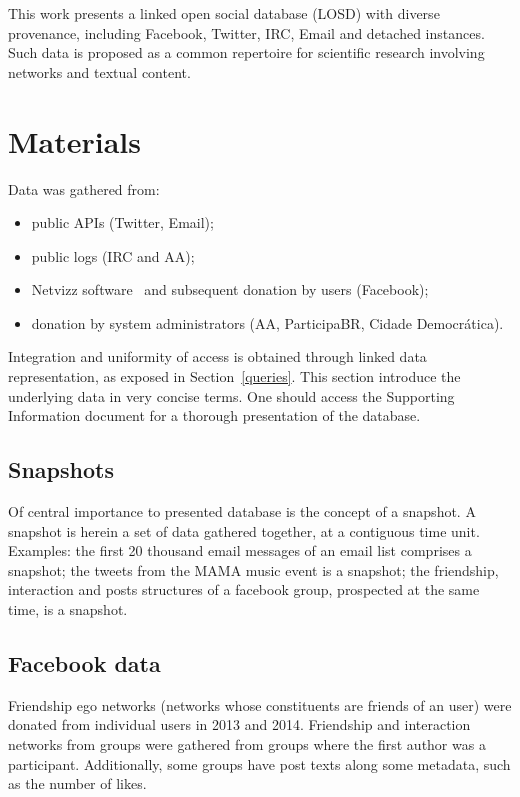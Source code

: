 \documentclass[review]{elsarticle}
\begin{document}
This work presents a linked open social database (LOSD) with diverse
provenance, including Facebook, Twitter, IRC, Email and detached
instances.
Such data is proposed as a common repertoire for scientific
research involving networks and textual content.


\section{Materials}\label{materials}
Data was gathered from:
\begin{itemize}
    \item public APIs (Twitter, Email);
    \item public logs (IRC and AA);
    \item Netvizz software~\cite{netvizz} and subsequent donation by users (Facebook);
    \item donation by system administrators (AA, ParticipaBR, Cidade Democr\'atica).
\end{itemize}

Integration and uniformity of access is obtained through linked data
representation, as exposed in Section~\ref{queries}.
This section introduce the underlying data in very concise terms.
One should access the Supporting Information document for
a thorough presentation of the database.

\subsection{Snapshots}
Of central importance to presented database is the concept of a snapshot.
A snapshot is herein a set of data gathered together, at a contiguous time
unit.
Examples: the first 20 thousand email messages of an email list
comprises a snapshot; the tweets from the MAMA music event is a
snapshot; the friendship, interaction and posts structures of a facebook
group, prospected at the same time, is a snapshot.

\subsection{Facebook data}
Friendship ego networks (networks whose constituents are friends of an user)
were donated from individual users in 2013 and 2014.
Friendship and interaction networks from groups were gathered from
groups where the first author was a participant.
Additionally, some groups have post texts along some metadata, such as
the number of likes.
\end{document}
